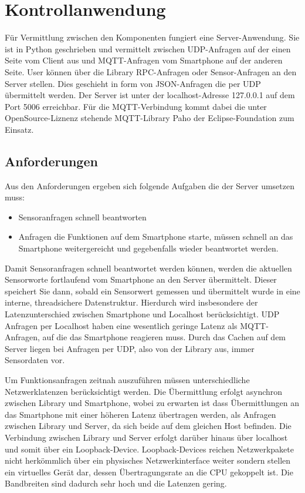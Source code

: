 \documentclass[11pt,a4paper]{report}
\begin{document}
\chapter{Kontrollanwendung}\label{chap:server_software}

Für Vermittlung zwischen den Komponenten fungiert eine Server-Anwendung.
Sie ist in Python geschrieben und vermittelt zwischen UDP-Anfragen auf der einen Seite vom Client aus und MQTT-Anfragen vom Smartphone auf der anderen Seite.
User können über die Library RPC-Anfragen oder Sensor-Anfragen an den Server stellen.
Dies geschieht in form von JSON-Anfragen die per UDP übermittelt werden.
Der Server ist unter der localhost-Adresse 127.0.0.1 auf dem Port 5006 erreichbar.
Für die MQTT-Verbindung kommt dabei die unter OpenSource-Liznenz stehende MQTT-Library Paho der Eclipse-Foundation zum Einsatz. \cite{paho}


\section{Anforderungen}
Aus den Anforderungen ergeben sich folgende Aufgaben die der Server umsetzen muss:
\begin{itemize}
\item Sensoranfragen schnell beantworten
\item Anfragen die Funktionen auf dem Smartphone starte, müssen schnell an das Smartphone weitergereicht und gegebenfalls wieder beantwortet werden.
\end{itemize}
Damit Sensoranfragen schnell beantwortet werden können, werden die aktuellen Sensorworte fortlaufend vom Smartphone an den Server übermittelt.
Dieser speichert Sie dann, sobald ein Sensorwert gemessen und übermittelt wurde in eine interne, threadsichere Datenstruktur.
Hierdurch wird insbesondere der Latenzunterschied zwischen Smartphone und Localhost berücksichtigt.
UDP Anfragen per Localhost haben eine wesentlich geringe Latenz als MQTT-Anfragen, auf die das Smartphone reagieren muss.
Durch das Cachen auf dem Server liegen bei Anfragen per UDP, also von der Library aus, immer Sensordaten vor.

Um Funktionsanfragen zeitnah auszuführen müssen unterschiedliche Netzwerklatenzen berücksichtigt werden.
Die Übermittlung erfolgt asynchron zwischen Library und Smartphone, wobei zu erwarten ist dass Übermittlungen an das Smartphone mit einer höheren Latenz übertragen werden, als Anfragen zwischen Library und Server, da sich beide auf dem gleichen Host befinden.
Die Verbindung zwischen Library und Server erfolgt darüber hinaus über localhost und somit über ein Loopback-Device.
Loopback-Devices reichen Netzwerkpakete nicht herkömmlich über ein physisches Netzwerkinterface weiter sondern stellen ein virtuelles Gerät dar, dessen Übertragungsrate an die CPU gekoppelt ist.
Die Bandbreiten sind dadurch sehr hoch und die Latenzen gering.
\end{document}
